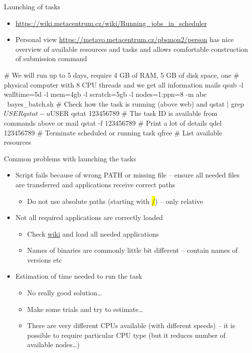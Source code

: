 \documentclass[compress, ucs, xelatex, 11pt, xcolor=svgnames,
  hyperref={
    bookmarks=true,
    unicode=true,
    colorlinks=true,
    pdftitle={Linux, command line and MetaCentrum},
    plainpages=false,
    pdfauthor={Vojtech Zeisek},
    pdfsubject={Course about use of Linux command line, writing shell scripts and using MetaCentrum of CESNET},
    pdfcreator={XeLaTeX},
    pdfkeywords={Linux, GNU, BASH, shell, command line, MetaCentrum},
    linkcolor=DarkRed,
    anchorcolor=DarkBlue,
    citecolor=Indigo,
    filecolor=NavyBlue,
    menucolor=DarkMagenta,
    urlcolor=DarkBlue,
    pdftex},
  url={hyphens, lowtilde} %
  ]{beamer}
\renewcommand{\texttt}[1]{\hl{\ttfamily #1}}
\begin{document}
\begin{frame}[fragile]{Launching of tasks}
\begin{itemize}
  \item \url{https://wiki.metacentrum.cz/wiki/Running_jobs_in_scheduler}
  \item Personal view \url{https://metavo.metacentrum.cz/pbsmon2/person} has nice overview of available resources and tasks and allows comfortable construction of submission command
\end{itemize}
  \begin{bashcode}
    # We will run up to 5 days, require 4 GB of RAM, 5 GB of disk space, one
    # physical computer with 8 CPU threads and we get all information mails
    qsub -l walltime=5d -l mem=4gb -l scratch=5gb -l nodes=1:ppn=8 -m abe \
      bayes_batch.sh
    # Check how the task is running (above web) and
    qstat | grep $USER
    qstat -u $USER
    qstat 123456789 # The task ID is available from commands above or mail
    qstat -f 123456789 # Print a lot of details
    qdel 123456789 # Terminate scheduled or running task
    qfree # List available resources
  \end{bashcode}
\end{frame}

\begin{frame}{Common problems with launching the tasks}
  \begin{itemize}
    \item Script fails because of wrong PATH or missing file -- ensure all needed files are transferred and applications receive correct paths
    \begin{itemize}
      \item Do not use absolute paths (starting with \texttt{/}) -- only relative
    \end{itemize}
    \item Not all required applications are correctly loaded
    \begin{itemize}
      \item Check \href{https://wiki.metacentrum.cz/wiki/Kategorie:Applications}{wiki} and load all needed applications
      \item Names of binaries are commonly little bit different -- contain names of versions etc
    \end{itemize}
    \item Estimation of time needed to run the task
    \begin{itemize}
      \item No really good solution\ldots
      \item Make some trials and try to estimate\ldots
      \item There are very different CPUs available (with different speeds) -- it is possible to require particular CPU type (but it reduces number of available nodes\ldots)
    \end{itemize}
  \end{itemize}
\end{frame}
\end{document}
